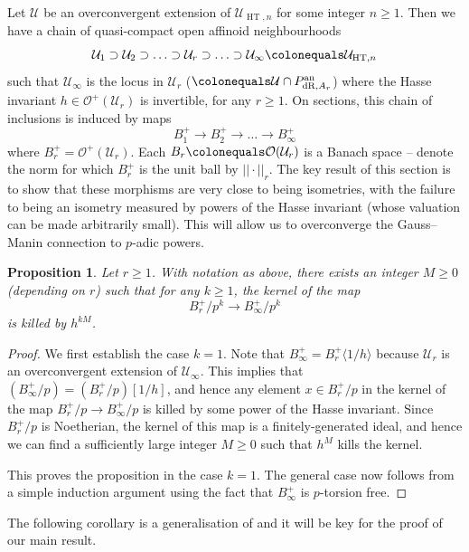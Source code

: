 \documentclass[10pt, oneside]{amsart}
\newcommand{\defeq}{\colonequals}
\numberwithin{equation}{subsection}
\newtheorem{proposition}[equation]{Proposition}
\theoremstyle{definition}
\theoremstyle{remark}
\newcommand{\opn}[1]{\operatorname{#1}}
\begin{document}
Let $\mathcal{U}$ be an overconvergent extension of $\mathcal{U}_{\opn{HT}, n}$ for some integer $n \geq 1$. Then we have a chain of quasi-compact open affinoid neighbourhoods 
\[
\mathcal{U}_1 \supset \mathcal{U}_2 \supset \ldots \supset \mathcal{U}_r \supset \ldots \supset \mathcal{U}_{\infty} \defeq \mathcal{U}_{\opn{HT}, n}
\]
such that $\mathcal{U}_{\infty}$ is the locus in $\mathcal{U}_r$ ($\defeq \mathcal{U} \cap P_{\opn{dR}, A_r}^{\opn{an}}$) where the Hasse invariant $h \in \mathcal{O}^+(\mathcal{U}_r)$ is invertible, for any $r \geq 1$. On sections, this chain of inclusions is induced by maps
\[
B_1^+ \to B_2^+ \to \ldots \to B_{\infty}^+
\]
where $B_r^+ = \mathcal{O}^+(\mathcal{U}_r)$. Each $B_r \defeq \mathcal{O}(\mathcal{U}_r)$ is a Banach space -- denote the norm for which $B_r^+$ is the unit ball by $|\!| \cdot |\!|_r$. The key result of this section is to show that these morphisms are very close to being isometries, with the failure to being an isometry measured by powers of the Hasse invariant (whose valuation can be made arbitrarily small). This will allow us to overconverge the Gauss--Manin connection to $p$-adic powers.

\begin{proposition} \label{KernelKilledByHasseProp}
Let $r \geq 1$. With notation as above, there exists an integer $M \geq 0$ (depending on $r$) such that for any $k \geq 1$, the kernel of the map
\[
B^+_{r}/p^k \to B^+_{\infty}/p^k
\]
is killed by $h^{kM}$.
\end{proposition}
\begin{proof}
We first establish the case $k=1$. Note that $B_{\infty}^+ = B_r^+\langle 1/h \rangle$ because $\mathcal{U}_r$ is an overconvergent extension of $\mathcal{U}_{\infty}$. This implies that $(B_\infty^+/p) = (B_r^+/p)[1/h]$, and hence any element $x \in B_r^+/p$ in the kernel of the map $B_r^+/p \to B_{\infty}^+/p$ is killed by some power of the Hasse invariant. Since $B_r^+/p$ is Noetherian, the kernel of this map is a finitely-generated ideal, and hence we can find a sufficiently large integer $M \geq 0$ such that $h^M$ kills the kernel. 

This proves the proposition in the case $k=1$. The general case now follows from a simple induction argument using the fact that $B_{\infty}^+$ is $p$-torsion free.
\end{proof}

The following corollary is a generalisation of \cite[Proposition 4.10]{AI_LLL} and it will be key for the proof of our main result.
\end{document}

